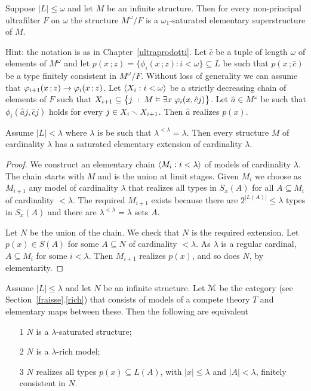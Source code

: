 \documentclass[creche.tex]{subfiles}
\begin{document}
\begin{exercise}
Suppose $|L|\le\omega$ and let $M$ be an infinite structure. Then for every non-principal ultrafilter $F$ on $\omega$ the structure $M^\omega/F$ is a $\omega_1$-saturated elementary superstructure of $M$.

Hint: the notation is as in Chapter~\ref{ultraprodotti}. Let $\hat c$ be a tuple of length $\omega$ of elements of $M^\omega$ and let $p(x\,;z)=\big\{\phi_i(x\,;z):i<\omega\big\}\subseteq L$ be such that $p(x\,;\hat c)$ be a type finitely consistent in $M^\omega/F$. Without loss of generality we can assume that $\varphi_{i+1}(x\,;z)\rightarrow\varphi_i(x\,;z)$. Let $\langle X_i:i<\omega\rangle$ be a strictly decreasing chain of elements of $F$ such that  $X_{i+1}\subseteq\big\{j\;:\;M\vDash\exists x\;\varphi_i(x,\hat cj)\big\}$. Let $\hat a\in M^\omega$ be such that  $\phi_i(\hat aj,\hat cj)$ holds for every $j\in X_i\smallsetminus X_{i+1}$. Then $\hat a$ realizes $p(x)$.\QED
\end{exercise}


\begin{theorem}\label{thm_esistenza_staturo_card_inacc}
Assume $|L|<\lambda$ where $\lambda$ is be such that $\lambda^{<\lambda}=\lambda$. Then every structure $M$ of cardinality $\lambda$ has a saturated elementary extension of cardinality $\lambda$.
\end{theorem}

\begin{proof}
We construct an elementary chain $\langle M_i : i<\lambda\rangle$ of models of cardinality $\lambda$. The chain starts with $M$ and is the union at limit stages. Given $M_i$ we choose as $M_{i+1}$ any model of cardinality $\lambda$ that realizes all types in $S_x(A)$ for all $A\subseteq M_i$ of cardinality $<\lambda$. The required $M_{i+1}$ exists because there are $2^{|L(A)|}\le\lambda$ types in $S_x(A)$ and there are $\lambda^{<\lambda}=\lambda$ sets $A$.

Let $N$ be the union of the chain. We check that $N$ is the required extension. Let $p(x)\in S(A)$ for some $A\subseteq N$ of cardinality $<\lambda$. As $\lambda$ is a regular cardinal,  $A\subseteq M_i$ for some $i<\lambda$. Then $M_{i+1}$ realizes $p(x)$, and so does $N$, by elementarity.
\end{proof}


\begin{theorem}\label{saturo->ricco}
Assume $|L|\le\lambda$ and let $N$ be an infinite structure. Let $\EuScript M$ be the category (see Section~\ref{fraisse}.\ref{rich}) that consists of models of a compete theory $T$ and elementary maps between these. Then the following are equivalent
\begin{itemize}
\item[1] $N$ is a $\lambda$-saturated structure;
\item[2] $N$ is a $\lambda$-rich model;
\item[3] $N$ realizes all types $p(x)\subseteq L(A)$, with $|x|\le\lambda$ and $|A|<\lambda$, finitely consistent in $N$.
\end{itemize}
\end{theorem}
\end{document}
